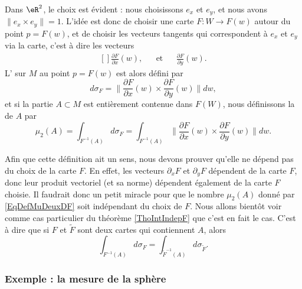 Dans $\eR^2$, le choix est évident : nous choisissons $e_x$ et $e_y$, et nous avons $\|e_x\times e_y\|=1$. L'idée est donc de choisir une carte $F\colon W\to F(w)$ autour du point $p=F(w)$, et de choisir les vecteurs tangents qui correspondent à $e_x$ et $e_y$ via la carte, c'est à dire les vecteurs
\begin{equation}
	\begin{aligned}[]
		\frac{ \partial F }{ \partial x }(w),&&\text{et}&&\frac{ \partial F }{ \partial y }(w).
	\end{aligned}
\end{equation}
L' sur $M$ au point $p=F(w)$ est alors défini par
\begin{equation}
	d\sigma_F=\|  \frac{ \partial F }{ \partial x }(w)\times\frac{ \partial F }{ \partial y }(w) \|dw,
\end{equation}
et si la partie $A\subset M$ est entièrement contenue dans $F(W)$, nous définissons la  de $A$ par
\begin{equation}		\label{EqDefMuDeuxDF}
	\mu_2(A)=\int_{F^{-1}(A)}d\sigma_F=\int_{F^{-1}(A)}\| \frac{ \partial F }{ \partial x }(w)\times\frac{ \partial F }{ \partial y }(w) \|dw.
\end{equation}
\begin{remark}
	Afin que cette définition ait un sens, nous devons prouver qu'elle ne dépend pas du choix de la carte $F$. En effet, les vecteurs $\partial_xF$ et $\partial_yF$ dépendent de la carte $F$, donc leur produit vectoriel (et sa norme) dépendent également de la carte $F$ choisie. Il faudrait donc un petit miracle pour que le nombre $\mu_2(A)$ donné par \eqref{EqDefMuDeuxDF} soit indépendant du choix de $F$.  Nous allons bientôt voir comme cas particulier du théorème \ref{ThoIntIndepF} que c'est en fait le cas. C'est à dire que si $F$ et $\tilde F$ sont deux cartes qui contiennent $A$, alors
	\begin{equation}
		\int_{F^{-1}(A)}d\sigma_F=\int_{\tilde F^{-1}(A)}d\sigma_{\tilde F}.
	\end{equation}
\end{remark}

\subsubsection{Exemple : la mesure de la sphère}

